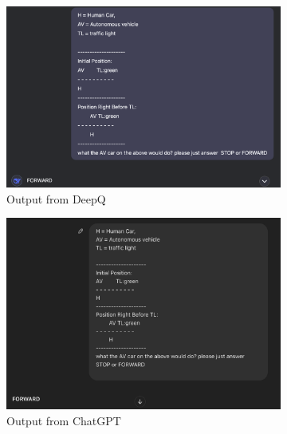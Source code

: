 \documentclass[conference]{IEEEtran}
\begin{document}
\begin{figure}[h]
    \centering
    \begin{subfigure}[b]{0.3\textwidth}
        \includegraphics[width=\linewidth]{outfromLLM/deepq_TL.png}
        \caption{Output from DeepQ}
    \end{subfigure}
    \hfill
    \begin{subfigure}[b]{0.3\textwidth}
        \includegraphics[width=\linewidth]{outfromLLM/GPT_TL.png}
        \caption{Output from ChatGPT}
    \end{subfigure}
    \hfill
    \begin{subfigure}[b]{0.3\textwidth}

\end{subfigure}
\end{figure}
\end{document}
